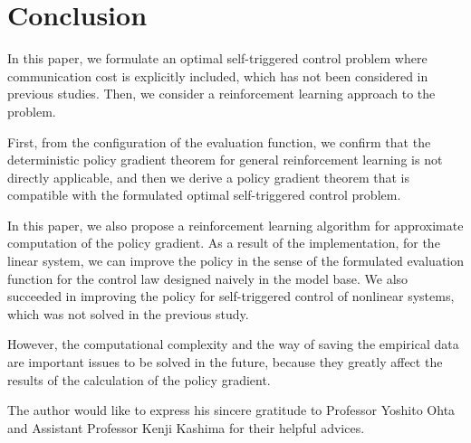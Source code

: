 \documentclass[english, dvipdfmx]{ampmt}             %
\begin{document}
\section{Conclusion}
In this paper, we formulate an optimal self-triggered control problem where communication cost is explicitly included, which has not been considered in previous studies. Then, we consider a reinforcement learning approach to the problem.  \par
First, from the configuration of the evaluation function, we confirm that the deterministic policy gradient theorem for general reinforcement learning is not directly applicable, and then we derive a policy gradient theorem that is compatible with the formulated optimal self-triggered control problem. \par
In this paper, we also propose a reinforcement learning algorithm for approximate computation of the policy gradient. As a result of the implementation, for the linear system, we can improve the policy in the sense of the formulated evaluation function for the control law designed naively in the model base. We also succeeded in improving the policy for self-triggered control of nonlinear systems, which was not solved in the previous study. \par
However, the computational complexity and the way of saving the empirical data are important issues to be solved in the future, because they greatly affect the results of the calculation of the policy gradient.

\acknowledgment
The author would like to express his sincere gratitude to Professor
Yoshito Ohta and Assistant Professor Kenji Kashima for their helpful advices.
\end{document}
